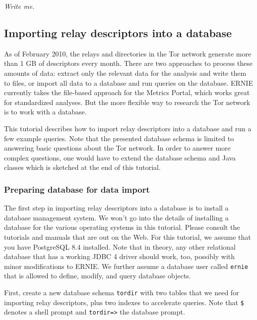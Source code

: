 \documentclass{article}
\begin{document}
{\it Write me.}

\subsection{Importing relay descriptors into a database}

As of February 2010, the relays and directories in the Tor network
generate more than 1 GB of descriptors every month.
There are two approaches to process these amounts of data:
extract only the relevant data for the analysis and write them to files,
or import all data to a database and run queries on the database.
ERNIE currently takes the file-based approach for the Metrics Portal,
which works great for standardized analyses.
But the more flexible way to research the Tor network is to work with a
database.

This tutorial describes how to import relay descriptors into a database
and run a few example queries.
Note that the presented database schema is limited to answering basic
questions about the Tor network.
In order to answer more complex questions, one would have to extend the
database schema and Java classes which is sketched at the end of this
tutorial.

\subsubsection{Preparing database for data import}

The first step in importing relay descriptors into a database is to
install a database management system.
We won't go into the details of installing a database for the various
operating systems in this tutorial.
Please consult the tutorials and manuals that are out on the Web.
For this tutorial, we assume that you have PostgreSQL 8.4 installed.
Note that in theory, any other relational database that has a working JDBC
4 driver should work, too, possibly with minor modifications to ERNIE.
We further assume a database user called \verb+ernie+ that is allowed to
define, modify, and query database objects.

First, create a new database schema \verb+tordir+ with two tables that we
need for importing relay descriptors, plus two indexes to accelerate
queries. Note that \verb+$+ denotes a shell prompt and \verb+tordir=>+ the
database prompt.
\end{document}
